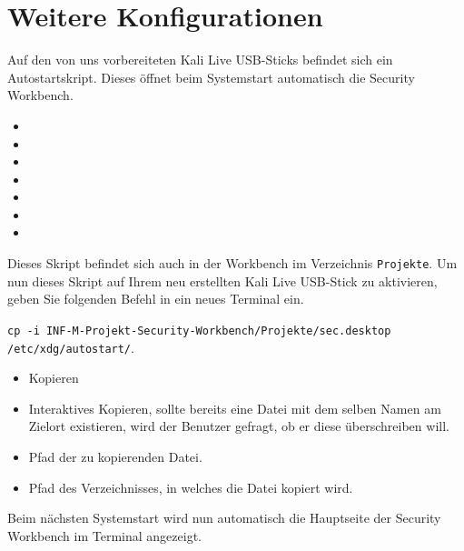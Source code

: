 \section{Weitere Konfigurationen}
Auf den von uns vorbereiteten Kali Live USB-Sticks befindet sich ein Autostartskript.  Dieses öffnet beim Systemstart automatisch die Security Workbench.
\begin{itemize}
	\item {} 
	\item {} 
	\item {}
	\item {} 
	\item {} 
	\item {} 
	\item {} 
\end{itemize}
Dieses Skript befindet sich auch in der Workbench im Verzeichnis \colorbox{altgray}{\lstinline|Projekte|}.
Um nun dieses Skript auf Ihrem neu erstellten Kali Live USB-Stick zu aktivieren, geben Sie folgenden Befehl in ein neues Terminal ein.

\colorbox{altgray}{\lstinline|cp -i INF-M-Projekt-Security-Workbench/Projekte/sec.desktop /etc/xdg/autostart/|}.

\begin{itemize}
	\item {} Kopieren 
	\item {} Interaktives Kopieren, sollte bereits eine Datei mit dem selben Namen am Zielort existieren, wird der Benutzer gefragt, ob er diese überschreiben will. 
	\item {} Pfad der zu kopierenden Datei.
	\item {} Pfad des Verzeichnisses, in welches die Datei kopiert wird.
\end{itemize}
Beim nächsten Systemstart wird nun automatisch die Hauptseite der Security Workbench im Terminal angezeigt. 